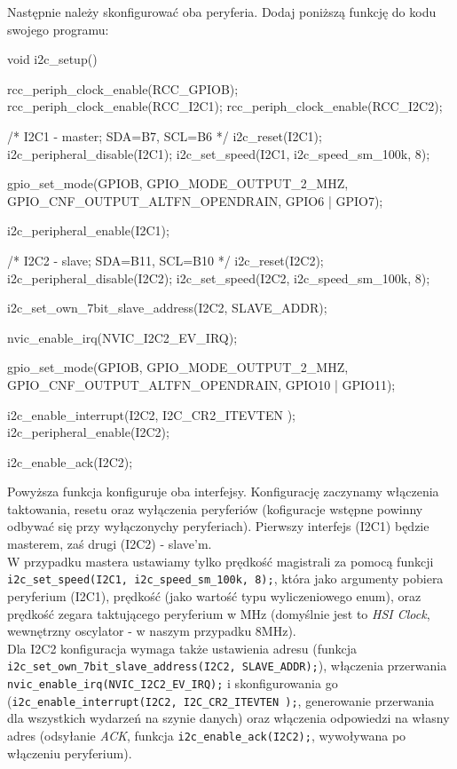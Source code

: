 \documentclass{pdfBooklets}
\begin{document}
Następnie należy skonfigurować oba peryferia. Dodaj poniższą funkcję do kodu swojego programu:
\begin{CodeFrame*}[c]{}
void i2c_setup(){
  rcc_periph_clock_enable(RCC_GPIOB);
  rcc_periph_clock_enable(RCC_I2C1);
  rcc_periph_clock_enable(RCC_I2C2);


  /* I2C1 - master; SDA=B7, SCL=B6 */
  i2c_reset(I2C1);
  i2c_peripheral_disable(I2C1);
  i2c_set_speed(I2C1, i2c_speed_sm_100k, 8);

  gpio_set_mode(GPIOB, GPIO_MODE_OUTPUT_2_MHZ,
		  GPIO_CNF_OUTPUT_ALTFN_OPENDRAIN, GPIO6 | GPIO7);
  
  i2c_peripheral_enable(I2C1);


  /* I2C2 - slave; SDA=B11, SCL=B10 */
  i2c_reset(I2C2);
  i2c_peripheral_disable(I2C2);
  i2c_set_speed(I2C2, i2c_speed_sm_100k, 8);

  i2c_set_own_7bit_slave_address(I2C2, SLAVE_ADDR);

  nvic_enable_irq(NVIC_I2C2_EV_IRQ);
  
  gpio_set_mode(GPIOB, GPIO_MODE_OUTPUT_2_MHZ,
		  GPIO_CNF_OUTPUT_ALTFN_OPENDRAIN, GPIO10 | GPIO11);

  i2c_enable_interrupt(I2C2, I2C_CR2_ITEVTEN );
  i2c_peripheral_enable(I2C2);

  
  i2c_enable_ack(I2C2);

}
\end{CodeFrame*}

Powyższa funkcja konfiguruje oba interfejsy. Konfigurację zaczynamy włączenia taktowania, resetu oraz wyłączenia peryferiów (kofiguracje wstępne
powinny odbywać się przy wyłączonychy peryferiach). Pierwszy interfejs (I2C1) będzie masterem,
zaś drugi (I2C2) - slave'm.\\

W przypadku mastera ustawiamy tylko prędkość magistrali za pomocą funkcji
\Verb$i2c_set_speed(I2C1, i2c_speed_sm_100k, 8);$, która jako argumenty pobiera peryferium (I2C1), prędkość (jako wartość typu wyliczeniowego enum),
oraz prędkość zegara taktującego peryferium w MHz (domyślnie jest to \textit{HSI Clock}, wewnętrzny oscylator - w naszym przypadku 8MHz).\\

Dla I2C2 konfiguracja wymaga także ustawienia adresu (funkcja \Verb$i2c_set_own_7bit_slave_address(I2C2, SLAVE_ADDR);$), włączenia przerwania
\Verb$nvic_enable_irq(NVIC_I2C2_EV_IRQ);$ i skonfigurowania go (\Verb$i2c_enable_interrupt(I2C2, I2C_CR2_ITEVTEN );$, generowanie przerwania dla wszystkich wydarzeń na szynie danych) oraz włączenia odpowiedzi na własny adres (odsyłanie \textit{ACK}, funkcja \Verb$i2c_enable_ack(I2C2);$,
wywoływana po włączeniu peryferium).
\end{document}
